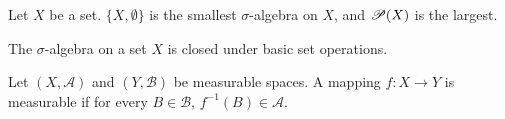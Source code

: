 \documentclass[class=book, crop=false]{standalone}
\begin{document}
        \begin{theorem}
            Let $X$ be a set. $\{X, \emptyset\}$ is the smallest $\sigma$-algebra on $X$, and $\mathscr{P}(X)$ is the largest.
        \end{theorem}

        \begin{remark}
            The $\sigma$-algebra on a set $X$ is closed under basic set operations.
        \end{remark}

        \begin{definition}
            Let $(X, \mathcal{A})$ and $(Y, \mathcal{B})$ be measurable spaces. A mapping $f : X \rightarrow Y$ is measurable if for every $B \in \mathcal{B}$, $f^{-1}(B) \in \mathcal{A}$.
        \end{definition}
\end{document}
